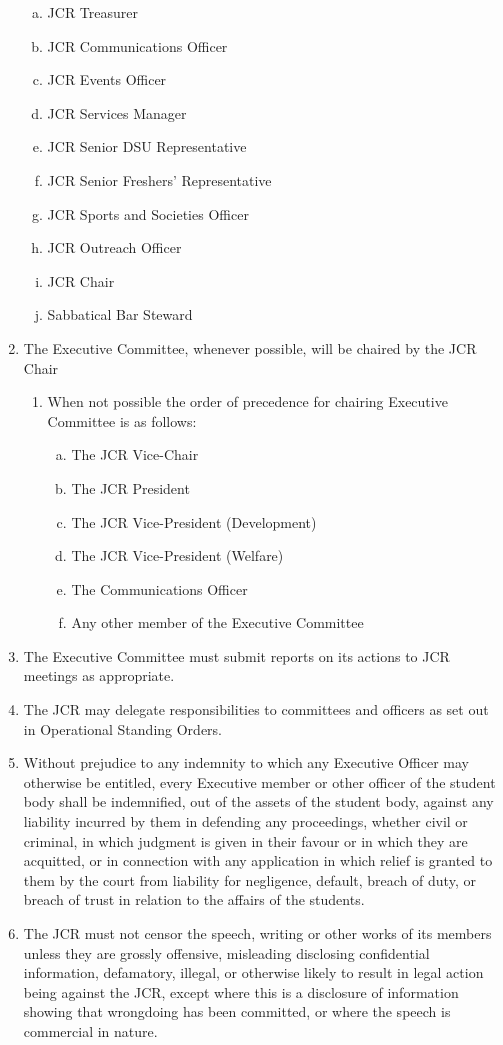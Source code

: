 \documentclass[12pt]{article}  %
\begin{document}
\begin{enumerate}
\begin{enumerate}[(a)]
        \item JCR Treasurer
        \item JCR Communications Officer
        \item JCR Events Officer
        \item JCR Services Manager
        \item JCR Senior DSU Representative
        \item JCR Senior Freshers’ Representative
        \item JCR Sports and Societies Officer
        \item JCR Outreach Officer
        \item JCR Chair
        \item Sabbatical Bar Steward
    \end{enumerate}
    \item The Executive Committee, whenever possible, will be chaired by the JCR Chair
    \begin{enumerate}
        \item When not possible the order of precedence for chairing Executive Committee is as follows:
        \begin{enumerate}[(a)]
            \item The JCR Vice-Chair
            \item The JCR President
            \item The JCR Vice-President (Development)
            \item The JCR Vice-President (Welfare)
            \item The Communications Officer
            \item Any other member of the Executive Committee
        \end{enumerate}
    \end{enumerate}
    \item The Executive Committee must submit reports on its actions to JCR meetings as appropriate.
    \item The JCR may delegate responsibilities to committees and officers as set out in Operational Standing Orders.
    \item Without prejudice to any indemnity to which any Executive Officer may otherwise be entitled, every Executive member or other officer of the student body shall be indemnified, out of the assets of the student body, against any liability incurred by them in defending any proceedings, whether civil or criminal, in which judgment is given in their favour or in which they are acquitted, or in connection with any application in which relief is granted to them by the court from liability for negligence, default, breach of duty, or breach of trust in relation to the affairs of the students.
    \item The JCR must not censor the speech, writing or other works of its members unless they are grossly offensive, misleading disclosing confidential information, defamatory, illegal, or otherwise likely to result in legal action being against the JCR, except where this is a disclosure of information showing that wrongdoing has been committed, or where the speech is commercial in nature.
\end{enumerate}
\end{document}
